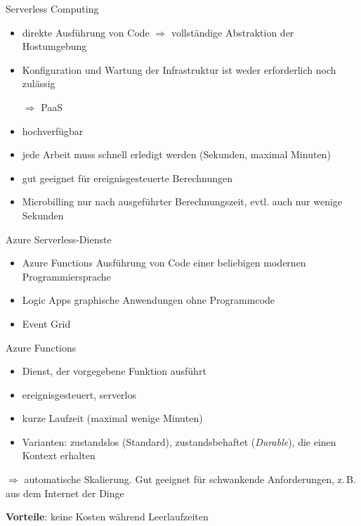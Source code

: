 \begin{flashcard}[Describe]{Serverless Computing}
    \begin{itemize}
        \item direkte Ausführung von Code\newline
        $\Rightarrow$ vollständige Abstraktion der Hostumgebung
        \item Konfiguration und Wartung der Infrastruktur ist weder erforderlich noch zulässig
        \item[$\Rightarrow$] PaaS
        \item hochverfügbar
        \item jede Arbeit muss schnell erledigt werden (Sekunden, maximal Minuten)
        \item gut geeignet für ereignisgesteuerte Berechnungen
        \item Microbilling nur nach ausgeführter Berechnungszeit, evtl. auch nur wenige Sekunden
    \end{itemize}

\end{flashcard}

\begin{flashcard}[\ ]{Azure Serverless-Dienste}
    \begin{itemize}
        \item Azure Functions\newline
        Ausführung von Code einer beliebigen modernen Programmiersprache
        \item Logic Apps\newline
        graphische Anwendungen ohne Programmcode
        \item Event Grid\newline
    \end{itemize}

\end{flashcard}

\begin{flashcard}[Definition]{Azure Functions}
    \begin{itemize}
        \item Dienst, der vorgegebene Funktion ausführt
        \item ereignisgesteuert, serverlos
        \item kurze Laufzeit (maximal wenige Minuten)
        \item Varianten: zustandslos (Standard), zustandsbehaftet (\emph{Durable}), die einen Kontext erhalten
    \end{itemize}
    $\Rightarrow$ automatische Skalierung. Gut geeignet für schwankende Anforderungen, z.\,B. aus dem Internet der Dinge

    \vspace{5mm}
    \textbf{Vorteile}: keine Kosten während Leerlaufzeiten
\end{flashcard}

